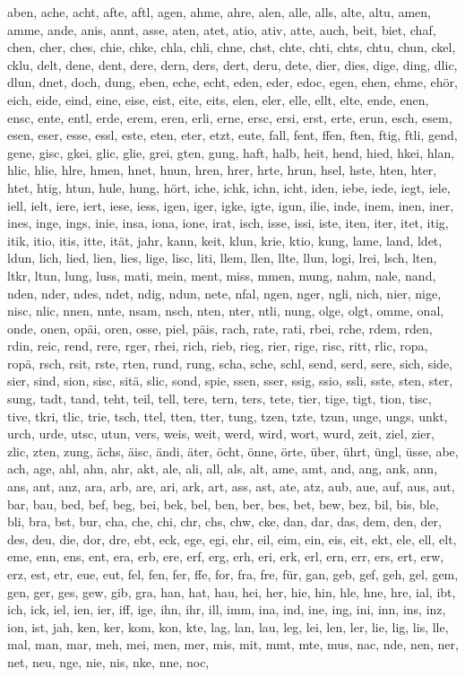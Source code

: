 \documentclass{article} \usepackage{iclr2022_conference,times}
\begin{document}
aben, ache, acht, afte, aftl, agen, ahme, ahre, alen, alle, alls, alte, altu, amen, amme, ande, anis, annt, asse, aten, atet, atio, ativ, atte, auch, beit, biet, chaf, chen, cher, ches, chie, chke, chla, chli, chne, chst, chte, chti, chts, chtu, chun, ckel, cklu, delt, dene, dent, dere, dern, ders, dert, deru, dete, dier, dies, dige, ding, dlic, dlun, dnet, doch, dung, eben, eche, echt, eden, eder, edoc, egen, ehen, ehme, ehör, eich, eide, eind, eine, eise, eist, eite, eits, elen, eler, elle, ellt, elte, ende, enen, ensc, ente, entl, erde, erem, eren, erli, erne, ersc, ersi, erst, erte, erun, esch, esem, esen, eser, esse, essl, este, eten, eter, etzt, eute, fall, fent, ffen, ften, ftig, ftli, gend, gene, gisc, gkei, glic, glie, grei, gten, gung, haft, halb, heit, hend, hied, hkei, hlan, hlic, hlie, hlre, hmen, hnet, hnun, hren, hrer, hrte, hrun, hsel, hste, hten, hter, htet, htig, htun, hule, hung, hört, iche, ichk, ichn, icht, iden, iebe, iede, iegt, iele, iell, ielt, iere, iert, iese, iess, igen, iger, igke, igte, igun, ilie, inde, inem, inen, iner, ines, inge, ings, inie, insa, iona, ione, irat, isch, isse, issi, iste, iten, iter, itet, itig, itik, itio, itis, itte, ität, jahr, kann, keit, klun, krie, ktio, kung, lame, land, ldet, ldun, lich, lied, lien, lies, lige, lisc, liti, llem, llen, llte, llun, logi, lrei, lsch, lten, ltkr, ltun, lung, luss, mati, mein, ment, miss, mmen, mung, nahm, nale, nand, nden, nder, ndes, ndet, ndig, ndun, nete, nfal, ngen, nger, ngli, nich, nier, nige, nisc, nlic, nnen, nnte, nsam, nsch, nten, nter, ntli, nung, olge, olgt, omme, onal, onde, onen, opäi, oren, osse, piel, päis, rach, rate, rati, rbei, rche, rdem, rden, rdin, reic, rend, rere, rger, rhei, rich, rieb, rieg, rier, rige, risc, ritt, rlic, ropa, ropä, rsch, rsit, rste, rten, rund, rung, scha, sche, schl, send, serd, sere, sich, side, sier, sind, sion, sisc, sitä, slic, sond, spie, ssen, sser, ssig, ssio, ssli, sste, sten, ster, sung, tadt, tand, teht, teil, tell, tere, tern, ters, tete, tier, tige, tigt, tion, tisc, tive, tkri, tlic, trie, tsch, ttel, tten, tter, tung, tzen, tzte, tzun, unge, ungs, unkt, urch, urde, utsc, utun, vers, weis, weit, werd, wird, wort, wurd, zeit, ziel, zier, zlic, zten, zung, ächs, äisc, ändi, äter, öcht, önne, örte, über, ührt, üngl, üsse, abe, ach, age, ahl, ahn, ahr, akt, ale, ali, all, als, alt, ame, amt, and, ang, ank, ann, ans, ant, anz, ara, arb, are, ari, ark, art, ass, ast, ate, atz, aub, aue, auf, aus, aut, bar, bau, bed, bef, beg, bei, bek, bel, ben, ber, bes, bet, bew, bez, bil, bis, ble, bli, bra, bst, bur, cha, che, chi, chr, chs, chw, cke, dan, dar, das, dem, den, der, des, deu, die, dor, dre, ebt, eck, ege, egi, ehr, eil, eim, ein, eis, eit, ekt, ele, ell, elt, eme, enn, ens, ent, era, erb, ere, erf, erg, erh, eri, erk, erl, ern, err, ers, ert, erw, erz, est, etr, eue, eut, fel, fen, fer, ffe, for, fra, fre, für, gan, geb, gef, geh, gel, gem, gen, ger, ges, gew, gib, gra, han, hat, hau, hei, her, hie, hin, hle, hne, hre, ial, ibt, ich, ick, iel, ien, ier, iff, ige, ihn, ihr, ill, imm, ina, ind, ine, ing, ini, inn, ins, inz, ion, ist, jah, ken, ker, kom, kon, kte, lag, lan, lau, leg, lei, len, ler, lie, lig, lis, lle, mal, man, mar, meh, mei, men, mer, mis, mit, mmt, mte, mus, nac, nde, nen, ner, net, neu, nge, nie, nis, nke, nne, noc, 
\end{document}
